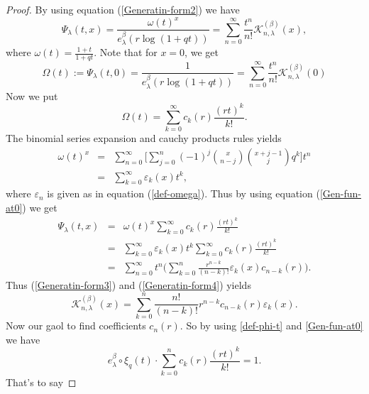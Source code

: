 \documentclass{birkjour}
\theoremstyle{definition}
\theoremstyle{remark}
\numberwithin{equation}{section}
\begin{document}
\begin{proof}
By using equation (\ref{Generatin-form2}) we have
\begin{equation}\label{Generatin-form3}
\Psi_{\lambda}(t,
x)=\displaystyle{\frac{\omega(t)^{x}}{e^{\beta}_{\lambda}(r\log(1+qt))}=
\sum^{\infty}_{n=0}\frac{t^{n}}{n!}\mathcal{K}^{(\beta)}_{n,
\lambda}(x)},
\end{equation}
where $\omega(t)=\frac{1+t}{1+qt}$. Note that for $x=0$, we get
\begin{equation}\label{def-phi-t}
\Omega(t):=\Psi_{\lambda}(t,
0)=\displaystyle{\frac{1}{e^{\beta}_{\lambda}(r\log(1+qt))}=
\sum^{\infty}_{n=0}\frac{t^{n}}{n!}\mathcal{K}^{(\beta)}_{n,
\lambda}(0)}
\end{equation}
Now we put
\begin{equation}\label{Gen-fun-at0}
\Omega(t)=\displaystyle{\sum^{\infty}_{k=0}c_{k}(r)\frac{(rt)^{k}}{k!}}.
\end{equation}
The binomial series expansion and cauchy products rules yields
\begin{eqnarray}
\omega(t)^{x}&=&
\displaystyle{\sum^{\infty}_{n=0}\Big[\sum^{n}_{j=0}
(-1)^{j}\binom{x}{n-j}\binom{x+j-1}{j}q^{k}\Big]t^{n}}\nonumber\\
&=&\displaystyle{\sum^{\infty}_{k=0}\varepsilon_{k}(x)t^{k}},
\end{eqnarray}
where $\varepsilon_{n}$ is given as in equation (\ref{def-omega}).
Thus by using equation (\ref{Gen-fun-at0}) we get
\begin{eqnarray}\label{Generatin-form4}
\Psi_{\lambda}(t, x)&=&\displaystyle{\omega(t)^{x}\sum^{\infty}_{k=0}c_{k}(r)\frac{(rt)^{k}}{k!}}\nonumber\\
&=&\displaystyle{\sum^{\infty}_{k=0}\varepsilon_{k}(x)t^{k}\sum^{\infty}_{k=0}c_{k}(r)\frac{(rt)^{k}}{k!}}\nonumber\\
&=&\displaystyle{\sum^{\infty}_{n=0}t^{n}\Big(\sum^{n}_{k=0}\frac{r^{n-k}}{(n-k)!}\varepsilon_{k}(x)c_{n-k}(r)\Big)}.
\end{eqnarray}
Thus (\ref{Generatin-form3}) and (\ref{Generatin-form4}) yields
$$\mathcal{K}^{(\beta)}_{n, \lambda}(x)=\displaystyle{\sum^{n}_{k=0}\frac{n!}{(n-k)!}r^{n-k}c_{n-k}(r)\varepsilon_{k}(x)}.$$
Now our gaol to find coefficients $c_{n}(r)$. So by using
\eqref{def-phi-t} and \eqref{Gen-fun-at0} we have
\begin{equation}\label{condition-coeff}
\displaystyle{e^{\beta}_{\lambda}\circ
\xi_{q}(t)\cdot\sum^{n}_{k=0}c_{k}(r)\frac{(rt)^{k}}{k!}=1}.
\end{equation}
That's to say

\end{proof}
\end{document}
